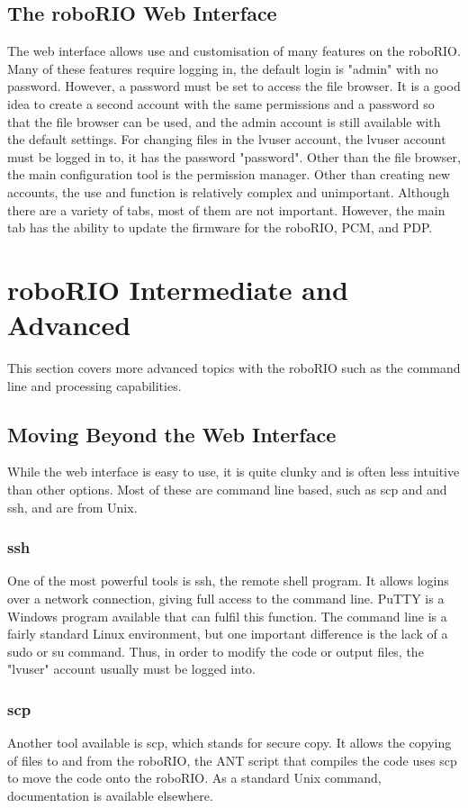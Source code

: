 \documentclass[]{report}
\begin{document}
\subsection{The roboRIO Web Interface}
The web interface allows use and customisation of many features on the roboRIO.
Many of these features require logging in, the default login is "admin" with no password.
However, a password must be set to access the file browser.
It is a good idea to create a second account with the same permissions and a password so that the file browser can be used, and the admin account is still available with the default settings.
For changing files in the lvuser account, the lvuser account must be logged in to, it has the password "password".
Other than the file browser, the main configuration tool is the permission manager.
Other than creating new accounts, the use and function is relatively complex and unimportant.
Although there are a variety of tabs, most of them are not important.
However, the main tab has the ability to update the firmware for the roboRIO, PCM, and PDP.


\section{roboRIO Intermediate and Advanced}
This section covers more advanced topics with the roboRIO such as the command line and processing capabilities.

\subsection{Moving Beyond the Web Interface}
While the web interface is easy to use, it is quite clunky and is often less intuitive than other options.
Most of these are command line based, such as scp and and ssh, and are from Unix.

\subsubsection{ssh}
One of the most powerful tools is ssh, the remote shell program.
It allows logins over a network connection, giving full access to the command line.
PuTTY is a Windows program available that can fulfil this function.
The command line is a fairly standard Linux environment, but one important difference is the lack of a sudo or su command.
Thus, in order to modify the code or output files, the "lvuser" account usually must be logged into.

\subsubsection{scp}
Another tool available is scp, which stands for secure copy.
It allows the copying of files to and from the roboRIO, the ANT script that compiles the code uses scp to move the code onto the roboRIO.
As a standard Unix command, documentation is available elsewhere.
\end{document}

